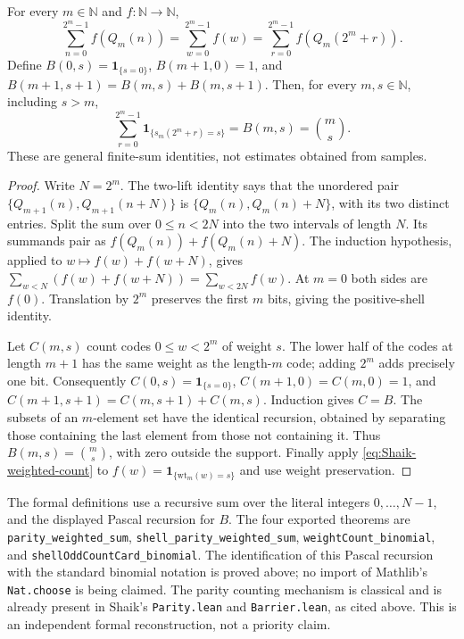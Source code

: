 \begin{proposition}
\label{prop:Shaik-weighted-count}
For every \(m\in\mathbb N\) and \(f:\mathbb N\to\mathbb N\),
\begin{equation}\label{eq:Shaik-weighted-count}
 \sum_{n=0}^{2^m-1}f(Q_m(n))
 =\sum_{w=0}^{2^m-1}f(w)
 =\sum_{r=0}^{2^m-1}f(Q_m(2^m+r)).
\end{equation}
Define \(B(0,s)=\mathbf1_{\{s=0\}}\),
\(B(m+1,0)=1\), and
\(B(m+1,s+1)=B(m,s)+B(m,s+1)\).
Then, for every \(m,s\in\mathbb N\), including \(s>m\),
\[
 \sum_{r=0}^{2^m-1}\mathbf1_{\{s_m(2^m+r)=s\}}
 =B(m,s)=\binom ms .
\]
These are general finite-sum identities, not estimates obtained from samples.
\end{proposition}
\begin{proof}
Write \(N=2^m\). The two-lift identity says that the unordered pair
\(\{Q_{m+1}(n),Q_{m+1}(n+N)\}\) is
\(\{Q_m(n),Q_m(n)+N\}\), with its two distinct entries.
Split the sum over \(0\le n<2N\) into the two intervals of length \(N\).
Its summands pair as
\(f(Q_m(n))+f(Q_m(n)+N)\).
The induction hypothesis, applied to
\(w\mapsto f(w)+f(w+N)\), gives
\(\sum_{w<N}(f(w)+f(w+N))=\sum_{w<2N}f(w)\).
At \(m=0\) both sides are \(f(0)\).
Translation by \(2^m\) preserves the first \(m\) bits, giving the
positive-shell identity.

Let \(C(m,s)\) count codes \(0\le w<2^m\) of weight \(s\).
The lower half of the codes at length \(m+1\) has the same weight as
the length-\(m\) code; adding \(2^m\) adds precisely one bit.
Consequently \(C(0,s)=\mathbf1_{\{s=0\}}\),
\(C(m+1,0)=C(m,0)=1\), and
\(C(m+1,s+1)=C(m,s+1)+C(m,s)\).
Induction gives \(C=B\). The subsets of an \(m\)-element set have
the identical recursion, obtained by separating those containing the
last element from those not containing it. Thus \(B(m,s)=\binom ms\),
with zero outside the support. Finally apply
\eqref{eq:Shaik-weighted-count} to
\(f(w)=\mathbf1_{\{\mathrm{wt}_m(w)=s\}}\) and use weight preservation.
\end{proof}

The formal definitions use a recursive sum over the literal integers
\(0,\ldots,N-1\), and the displayed Pascal recursion for \(B\).
The four exported theorems are
\texttt{parity\_weighted\_sum},
\texttt{shell\_parity\_weighted\_sum},
\texttt{weightCount\_binomial}, and
\texttt{shellOddCountCard\_binomial}.
The identification of this Pascal recursion with the standard binomial
notation is proved above; no import of Mathlib's \texttt{Nat.choose}
is being claimed.
The parity counting mechanism is classical and is already present in
Shaik's \texttt{Parity.lean} and \texttt{Barrier.lean}, as cited above.
This is an independent formal reconstruction, not a priority claim.

